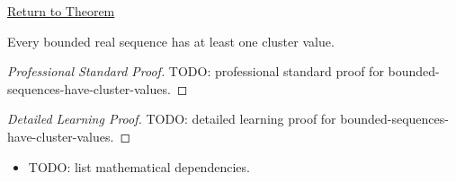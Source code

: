 \newpage
{}
\label{prf:bounded-sequences-have-cluster-values}

\begin{remark*}[Return]
\hyperref[thm:bounded-sequences-have-cluster-values]{Return to Theorem}
\end{remark*}

\begin{theorem*}
Every bounded real sequence has at least one cluster value.

\smallskip
\noindent
\end{theorem*}

\begin{proof}[Professional Standard Proof]
\LRAProofBodyStart
TODO: professional standard proof for bounded-sequences-have-cluster-values.
\end{proof}

\begin{proof}[Detailed Learning Proof]
\LRAProofBodyStart
TODO: detailed learning proof for bounded-sequences-have-cluster-values.
\end{proof}

\begin{remark*}
\end{remark*}

\begin{dependencies}
\begin{itemize}
  \item TODO: list mathematical dependencies.
\end{itemize}
\end{dependencies}

\clearpage
